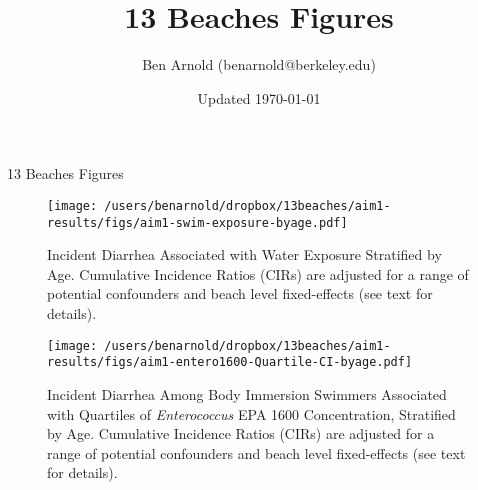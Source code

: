 \documentclass[11pt]{article}
\title{13 Beaches Figures}
\author{Ben Arnold (benarnold@berkeley.edu)}
\date{Updated \today}
\begin{document}
{\centerline {\LARGE 13 Beaches Figures} }


\begin{landscape}
\begin{figure}[htbp]
\begin{center}
\texttt{[image: /users/benarnold/dropbox/13beaches/aim1-results/figs/aim1-swim-exposure-byage.pdf]}
\begin{minipage}{1.2\textwidth}
\caption{Incident Diarrhea Associated with Water Exposure Stratified by Age. Cumulative Incidence Ratios (CIRs) are adjusted for a range of potential confounders and beach level fixed-effects (see text for details).}
\label{fig:swimex}
\end{minipage}
\end{center}
\end{figure}
\end{landscape}

\begin{landscape}
\begin{figure}[htbp]
\begin{center}
\texttt{[image: /users/benarnold/dropbox/13beaches/aim1-results/figs/aim1-entero1600-Quartile-CI-byage.pdf]} 
\begin{minipage}{1.2\textwidth}
\caption{Incident Diarrhea Among Body Immersion Swimmers Associated with Quartiles of \textit{Enterococcus} EPA 1600 Concentration, Stratified by Age. Cumulative Incidence Ratios (CIRs) are adjusted for a range of potential confounders and beach level fixed-effects (see text for details).}
\label{fig:enteroquartile}
\end{minipage}
\end{center}
\end{figure}
\end{landscape}
\end{document}
